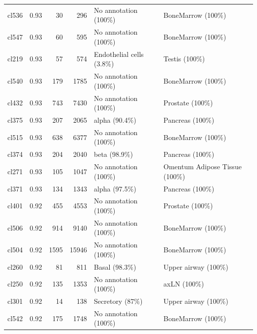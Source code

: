 \begin{table}[ht!]
\begin{tabular}{lrrrll}
  cl536 & 0.93 &  30 & 296 & No annotation (100\%) & BoneMarrow (100\%) \\ 
  cl547 & 0.93 &  60 & 595 & No annotation (100\%) & BoneMarrow (100\%) \\ 
  cl219 & 0.93 &  57 & 574 & Endothelial cells (3.8\%) & Testis (100\%) \\ 
  cl540 & 0.93 & 179 & 1785 & No annotation (100\%) & BoneMarrow (100\%) \\ 
  cl432 & 0.93 & 743 & 7430 & No annotation (100\%) & Prostate (100\%) \\ 
  cl375 & 0.93 & 207 & 2065 & alpha (90.4\%) & Pancreas (100\%) \\ 
  cl515 & 0.93 & 638 & 6377 & No annotation (100\%) & BoneMarrow (100\%) \\ 
  cl374 & 0.93 & 204 & 2040 & beta (98.9\%) & Pancreas (100\%) \\ 
  cl271 & 0.93 & 105 & 1047 & No annotation (100\%) & Omentum Adipose Tissue (100\%) \\ 
  cl371 & 0.93 & 134 & 1343 & alpha (97.5\%) & Pancreas (100\%) \\ 
  cl401 & 0.92 & 455 & 4553 & No annotation (100\%) & Prostate (100\%) \\ 
  cl506 & 0.92 & 914 & 9140 & No annotation (100\%) & BoneMarrow (100\%) \\ 
  cl504 & 0.92 & 1595 & 15946 & No annotation (100\%) & BoneMarrow (100\%) \\ 
  cl260 & 0.92 &  81 & 811 & Basal (98.3\%) & Upper airway (100\%) \\ 
  cl250 & 0.92 & 135 & 1353 & No annotation (100\%) & axLN (100\%) \\ 
  cl301 & 0.92 &  14 & 138 & Secretory (87\%) & Upper airway (100\%) \\ 
  cl542 & 0.92 & 175 & 1748 & No annotation (100\%) & BoneMarrow (100\%) \\ 
   \bottomrule
\end{tabular}
\end{table}  
  
